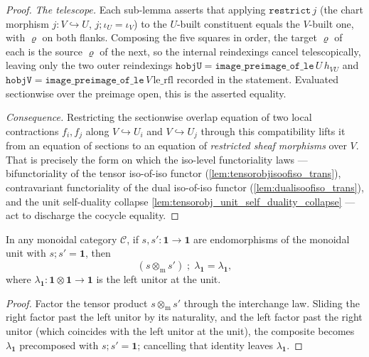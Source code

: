 \begin{proof}
  \emph{The telescope.} Each sub-lemma asserts that applying \(\mathtt{restrict}\,j\) (the chart
  morphism \(j : V \hookrightarrow U\), \(j \mathbin{;} \iota_U = \iota_V\)) to the \(U\)-built
  constituent equals the \(V\)-built one, with \(\varrho\) on both flanks. Composing the five
  squares in order, the target \(\varrho\) of each is the source \(\varrho\) of the next, so the
  internal reindexings cancel telescopically, leaving only the two outer reindexings
  \(\mathtt{hobjU} = \mathtt{image\_preimage\_of\_le}\,U\,h_{VU}\) and
  \(\mathtt{hobjV} = \mathtt{image\_preimage\_of\_le}\,V\,\mathrm{le\_rfl}\) recorded in the
  statement. Evaluated sectionwise over the preimage open,
  this is the asserted equality.

  \emph{Consequence.} Restricting the sectionwise overlap equation of two local contractions
  \(f_i, f_j\) along \(V \hookrightarrow U_i\) and \(V \hookrightarrow U_j\) through this
  compatibility lifts it from an equation of sections to an equation of \emph{restricted sheaf
  morphisms} over \(V\). That is precisely the form on which the iso-level functoriality laws
  --- bifunctoriality of the tensor iso-of-iso functor (\cref{lem:tensorobjisoofiso_trans}),
  contravariant functoriality of the dual iso-of-iso functor (\cref{lem:dualisoofiso_trans}), and
  the unit self-duality collapse \cref{lem:tensorobj_unit_self_duality_collapse} --- act to
  discharge the cocycle equality.
\end{proof}

\begin{lemma}



  \label{lem:tensorhom_inv_comp_leftunitor}
  In any monoidal category \(\mathcal C\), if \(s, s' : \mathbf 1 \to \mathbf 1\) are endomorphisms
  of the monoidal unit with \(s \mathbin{;} s' = \mathbf 1\), then
  \[
    (s \otimes_{\mathrm m} s') \;\mathbin{;}\; \lambda_{\mathbf 1} = \lambda_{\mathbf 1},
  \]
  where \(\lambda_{\mathbf 1} : \mathbf 1 \otimes \mathbf 1 \to \mathbf 1\) is the left unitor at the
  unit.
\end{lemma}
\begin{proof}
  Factor the tensor product \(s \otimes_{\mathrm m} s'\) through the interchange law. Sliding the
  right factor past the left unitor by its naturality, and the left factor past the right unitor
  (which coincides with the left unitor at the unit), the composite becomes \(\lambda_{\mathbf 1}\)
  precomposed with \(s \mathbin{;} s' = \mathbf 1\); cancelling that identity leaves
  \(\lambda_{\mathbf 1}\).
\end{proof}

